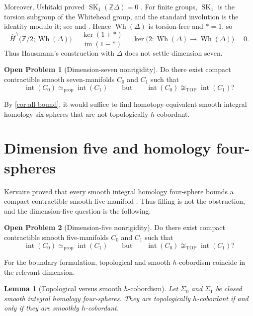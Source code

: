\documentclass[10pt,reqno]{amsart}
\numberwithin{equation}{section}
\newtheorem{lemma}{Lemma}
\theoremstyle{definition}
\newtheorem{problem}{Open Problem}
\theoremstyle{remark}
\newcommand{\Z}{\mathbb Z}
\newcommand{\TOP}{\mathrm{TOP}}
\newcommand{\Wh}{\operatorname{Wh}}
\newcommand{\Int}{\operatorname{int}}
\newcommand{\simeqp}{\simeq_{\mathrm{prop}}}
\begin{document}
Moreover, Ushitaki proved \(\operatorname{SK}_1(\Z\Delta)=0\)
\cite[Theorem~A]{UshitakiMilnor}.  For finite groups,
\(\operatorname{SK}_1\) is the torsion subgroup of the Whitehead group,
and the standard involution is the identity modulo it; see
\cite[p.~404]{UshitakiMilnor} and
\cite[Corollary~7.5]{OliverWhitehead}.  Hence \(\Wh(\Delta)\) is
torsion-free and \(*=1\), so
\[
\widehat H^{\,7}\bigl(\Z/2;\Wh(\Delta)\bigr)
=
\frac{\ker(1+*)}{\operatorname{im}(1-*)}
=
\ker\bigl(2:\Wh(\Delta)\longrightarrow\Wh(\Delta)\bigr)
=
0.
\]
Thus Hausmann's construction with \(\Delta\) does not settle dimension
seven.

\begin{problem}[Dimension-seven nonrigidity]
\label{prob:dimension-seven}
Do there exist compact contractible smooth seven-manifolds \(C_0\) and
\(C_1\) such that
\[
\Int(C_0)\simeqp\Int(C_1)
\qquad\text{but}\qquad
\Int(C_0)\not\cong_{\TOP}\Int(C_1)?
\]
\end{problem}

By \cref{cor:all-bound}, it would suffice to find homotopy-equivalent
smooth integral homology six-spheres that are not topologically
\(h\)-cobordant.

\section{Dimension five and homology four-spheres}
\label{sec:dimension-five}

Kervaire proved that every smooth integral homology four-sphere bounds a
compact contractible smooth five-manifold
\cite[Theorem~3]{KervaireHomologySpheres}.  Thus filling is not the
obstruction, and the dimension-five question is the following.

\begin{problem}[Dimension-five nonrigidity]
\label{prob:dimension-five}
Do there exist compact contractible smooth five-manifolds \(C_0\) and
\(C_1\) such that
\[
\Int(C_0)\simeqp\Int(C_1)
\qquad\text{but}\qquad
\Int(C_0)\not\cong_{\TOP}\Int(C_1)?
\]
\end{problem}

For the boundary formulation, topological and smooth \(h\)-cobordism
coincide in the relevant dimension.

\begin{lemma}[Topological versus smooth \(h\)-cobordism]
\label{lem:homology-four-sphere-smoothing}
Let \(\Sigma_0\) and \(\Sigma_1\) be closed smooth integral homology
four-spheres.  They are topologically \(h\)-cobordant if and only if
they are smoothly \(h\)-cobordant.
\end{lemma}
\end{document}
